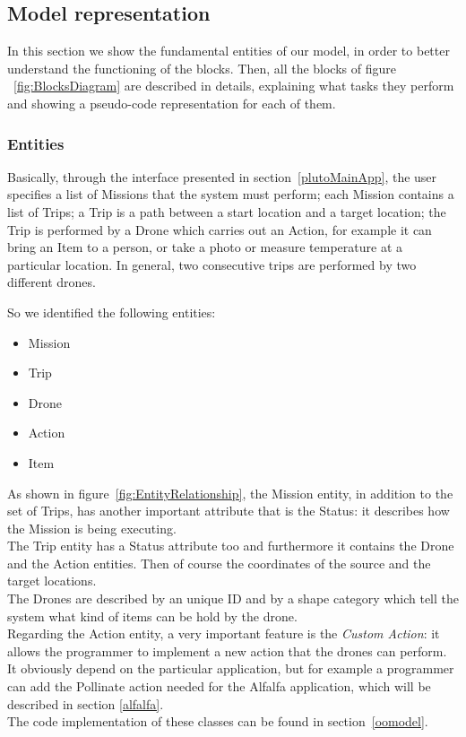 \newpage
\subsection{Model representation}
\label{modelRepresentation}
In this section we show the fundamental entities of our model, in order to better understand the functioning of the blocks. Then, all the blocks of figure ~\ref{fig:BlocksDiagram} are described in details, explaining what tasks they perform and showing a pseudo-code representation for each of them.

\subsubsection {Entities}

Basically, through the interface presented in section~\ref{plutoMainApp}, the user specifies a list of Missions that the system must perform; each Mission contains a list of Trips; a Trip is a path between a start location and a target location; the Trip is performed by a Drone which carries out an Action, for example it can bring an Item to a person, or take a photo or measure temperature at a particular location.
In general, two consecutive trips are performed by two different drones.

So we identified the following entities:

\begin{itemize}
\itemsep2pt
\item{
Mission
}
\item{
Trip
}
\item{
Drone
}
\item{
Action
}
\item{
Item
}
\end{itemize}

As shown in figure~\ref{fig:EntityRelationship}, the Mission entity, in addition to the set of Trips, has another important attribute that is the Status: it describes how the Mission is being executing.
\\
The Trip entity has a Status attribute too and furthermore it contains the Drone and the Action entities. Then of course the coordinates of the source and the target locations.
\\
The Drones are described by an unique ID and by a shape category which tell the system what kind of items can be hold by the drone.
\\
Regarding the Action entity, a very important feature is the \textit{Custom Action}: it allows the programmer to implement a new action that the drones can perform.
It obviously depend on the particular application, but for example a programmer can add the Pollinate action needed for the Alfalfa application\cite{alfalfa}, which will be described in section \ref{alfalfa}.
\\
The code implementation of these classes can be found in section~\ref{oomodel}.

